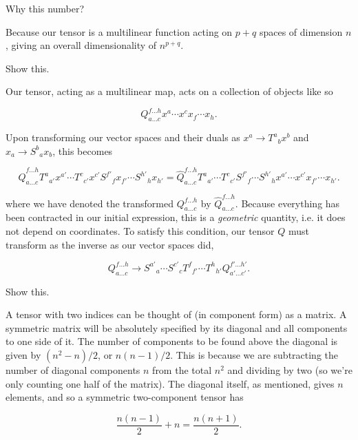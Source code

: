 \documentclass[../the-road-to-reality.tex]{subfiles}
\begin{document}
\begin{questions}
\question Why this number?

\begin{solution}
        Because our tensor is a multilinear function acting on $p + q$ spaces of dimension $n$, giving an overall dimensionality of $n^{p+q}$.
\end{solution}

\question Show this.

\begin{solution}
       Our tensor, acting as a multilinear map, acts on a collection of objects like so

	\[
       Q^{f\dots{h}}_{a\dots{c}}x^a\cdots{x}^cx_f\cdots{x}_h
	.\] 

       Upon transforming our vector spaces and their duals as $x^a \to {T^a}_bx^b$ and $x_a \to {S^b}_ax_b$, this becomes

	\[
       \hat{Q}^{f\dots{h}}_{a\dots{c}}{T^a}_{a'}x^{a'}\cdots{T^c}_{c'}x^{c'}{S^{f'}}_fx_{f'}\cdots{S^{h'}}_hx_{h'} = \hat{Q}^{f\dots{h}}_{a\dots{c}}{T^a}_{a'}\cdots{T^c}_{c'}{S^{f'}}_f\cdots{S^{h'}}_h{x^{a'}}\cdots{x^{c'}}x_{f'}\cdots{x_{h'}}
	.\] 

       where we have denoted the transformed $Q^{f\dots{h}}_{a\dots{c}}$ by $\hat{Q}^{f\dots{h}}_{a\dots{c}}$. Because everything has been contracted in our initial expression, this is a \textit{geometric} quantity, i.e. it does not depend on coordinates. To satisfy this condition, our tensor $Q$ must transform as the inverse as our vector spaces did,

       \[
        Q^{f\dots{h}}_{a\dots{c}} \to {S^{a'}}_a\cdots{S^{c'}}_c{T^f}_{f'}\cdots{T^h}_{h'}Q^{f'\dots{h'}}_{a'\dots{c'}}
       .\] 
\end{solution}

\question Show this.

\begin{solution}
        A tensor with two indices can be thought of (in component form) as a matrix. A symmetric matrix will be absolutely specified by its diagonal and all components to one side of it. The number of components to be found above the diagonal is given by $(n^2 - n)/2$, or $n(n-1)/2$. This is because we are subtracting the number of diagonal components $n$ from the total $n^2$ and dividing by two (so we're only counting one half of the matrix). The diagonal itself, as mentioned, gives $n$ elements, and so a symmetric two-component tensor has

	\[
        \frac{n(n-1)}{2} + n = \frac{n(n+1)}{2}
	.\] 


\end{solution}
\end{questions}
\end{document}
